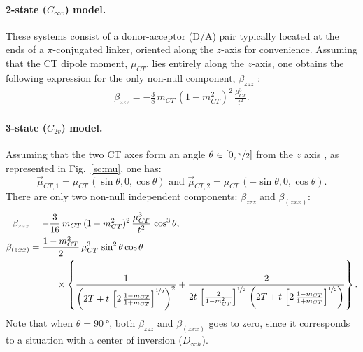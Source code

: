 \documentclass[12pt,a4paper]{article}
\begin{document}
\paragraph{2-state ($C_{\infty v}$) model.} These systems consist of a donor-acceptor (D/A) pair typically located at the ends of a $\pi$-conjugated linker, oriented along the $z$-axis for convenience. Assuming that the CT dipole moment, $\mu_{CT}$, lies entirely along the $z$-axis, one obtains the following expression for the only non-null component, $\beta_{zzz}$ \cite{barzoukasTWOFORMDESCRIPTIONPUSHPULL1996,barzoukasTwostateDescriptionHyper1996,blanchard-desceTwoformTwostateAnalysis1998a}:
\begin{align}
	\beta_{zzz} = -\frac{3}{8}\,m_{CT}\,(1 - m_{CT}^2)^2\,\frac{\mu_{CT}^3}{t^2}. \label{eq:2state}
\end{align}


\paragraph{3-state ($C_{2v}$) model.} Assuming that the two CT axes form an angle $\theta\in[0,\nicefrac{\pi}{2}]$ from the $z$ axis \cite{yangLargeOffDiagonalContribution2003}, as represented in Fig.~\ref{sc:mu}, one has:\begin{equation}
	\vec\mu_{CT,1} = \mu_{CT}\,(\sin\theta,0,\cos\theta) \text{ and } \vec\mu_{CT,2} = \mu_{CT}\,(-\sin\theta,0,\cos\theta). 
\end{equation}
There are only two non-null independent components: $\beta_{zzz}$ and  $\beta_{(zxx)}$:\begin{align}
	\beta_{zzz} &= -\frac{3}{16}\,m_{CT}\,(1-m_{CT}^2)^2\,\frac{\mu_{CT}^3}{t^2}\,\cos^3\theta,\nonumber\\
	\beta_{(zxx)} &= \frac{1-m_{CT}^2}{2}\,\mu_{CT}^3\,\sin^2\theta\cos\theta\nonumber\\
	&\hspace{1cm}\times\left\{\frac{1}{\left(2T + t\,\left[2\,\frac{1-m_{CT}}{1+m_{CT}}\right]^{\nicefrac{1}{2}}\right)^2} + \frac{2}{2t\,\left[\frac{2}{1-m_{CT}^2}\right]^{\nicefrac{1}{2}}\,\left(2T + t\,\left[2\,\frac{1-m_{CT}}{1+m_{CT}}\right]^{\nicefrac{1}{2}}\right)}\right\}.\label{eq:3state}
\end{align}
Note that when $\theta=\SI{90}{°}$, both $\beta_{zzz}$ and $\beta_{(zxx)}$ goes to zero, since it corresponds to a situation with a center of inversion ($D_{\infty h}$). 
\end{document}
